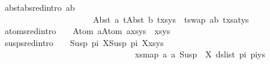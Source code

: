 \begin{isabellebody}
\ \ abst{\isacharunderscore}{\kern0pt}ab{\isacharunderscore}{\kern0pt}sred{\isacharbrackleft}{\kern0pt}intro{\isacharbang}{\kern0pt}{\isacharbrackright}{\kern0pt}{\isacharcolon}{\kern0pt}\ {\isachardoublequoteopen}a{\isasymnoteq}b\ {\isasymLongrightarrow}\ \isanewline
\ \ \ \ \ \ \ \ \ \ \ \ \ \ \ \ \ \ \ \ \ \ \ {\isacharparenleft}{\kern0pt}{\isacharparenleft}{\kern0pt}Abst\ a\ t{}{\isasymapprox}{\isacharquery}{\kern0pt}Abst\ b\ t{}{\isacharparenright}{\kern0pt}{\isacharhash}{\kern0pt}xs{\isacharcomma}{\kern0pt}ys{\isacharparenright}{\kern0pt}\ {\isasymturnstile}{\isacharbrackleft}{\kern0pt}{\isacharbrackright}{\kern0pt}{\isasymleadsto}\ {\isacharparenleft}{\kern0pt}{\isacharparenleft}{\kern0pt}t{}{\isasymapprox}{\isacharquery}{\kern0pt}swap\ {\isacharbrackleft}{\kern0pt}{\isacharparenleft}{\kern0pt}a{\isacharcomma}{\kern0pt}b{\isacharparenright}{\kern0pt}{\isacharbrackright}{\kern0pt}\ t{}{\isacharparenright}{\kern0pt}{\isacharhash}{\kern0pt}xs{\isacharcomma}{\kern0pt}{\isacharparenleft}{\kern0pt}a{\isasymsharp}{\isacharquery}{\kern0pt}t{}{\isacharparenright}{\kern0pt}{\isacharhash}{\kern0pt}ys{\isacharparenright}{\kern0pt}{\isachardoublequoteclose}\ {\isacharbar}{\kern0pt}\isanewline
\ \ atom{\isacharunderscore}{\kern0pt}sred{\isacharbrackleft}{\kern0pt}intro{\isacharbang}{\kern0pt}{\isacharbrackright}{\kern0pt}{\isacharcolon}{\kern0pt}\ \ \ \ {\isachardoublequoteopen}{\isacharparenleft}{\kern0pt}{\isacharparenleft}{\kern0pt}Atom\ a{\isasymapprox}{\isacharquery}{\kern0pt}Atom\ a{\isacharparenright}{\kern0pt}{\isacharhash}{\kern0pt}xs{\isacharcomma}{\kern0pt}ys{\isacharparenright}{\kern0pt}\ {\isasymturnstile}{\isacharbrackleft}{\kern0pt}{\isacharbrackright}{\kern0pt}{\isasymleadsto}\ {\isacharparenleft}{\kern0pt}xs{\isacharcomma}{\kern0pt}ys{\isacharparenright}{\kern0pt}{\isachardoublequoteclose}\ {\isacharbar}{\kern0pt}\isanewline
\ \ susp{\isacharunderscore}{\kern0pt}sred{\isacharbrackleft}{\kern0pt}intro{\isacharbang}{\kern0pt}{\isacharbrackright}{\kern0pt}{\isacharcolon}{\kern0pt}\ \ \ \ {\isachardoublequoteopen}{\isacharparenleft}{\kern0pt}{\isacharparenleft}{\kern0pt}Susp\ pi{}\ X{\isasymapprox}{\isacharquery}{\kern0pt}Susp\ pi{}\ X{\isacharparenright}{\kern0pt}{\isacharhash}{\kern0pt}xs{\isacharcomma}{\kern0pt}ys{\isacharparenright}{\kern0pt}\ \isanewline
\ \ \ \ \ \ \ \ \ \ \ \ \ \ \ \ \ \ \ \ \ \ \ \ \ \ \ \ \ \ \ \ {\isasymturnstile}{\isacharbrackleft}{\kern0pt}{\isacharbrackright}{\kern0pt}{\isasymleadsto}\ {\isacharparenleft}{\kern0pt}xs{\isacharcomma}{\kern0pt}{\isacharparenleft}{\kern0pt}map\ {\isacharparenleft}{\kern0pt}{\isasymlambda}a{\isachardot}{\kern0pt}\ a{\isasymsharp}{\isacharquery}{\kern0pt}\ Susp\ {\isacharbrackleft}{\kern0pt}{\isacharbrackright}{\kern0pt}\ X{\isacharparenright}{\kern0pt}\ {\isacharparenleft}{\kern0pt}ds{\isacharunderscore}{\kern0pt}list\ pi{}\ pi{}{\isacharparenright}{\kern0pt}{\isacharparenright}{\kern0pt}{\isacharat}{\kern0pt}ys{\isacharparenright}{\kern0pt}{\isachardoublequoteclose}\ {\isacharbar}{\kern0pt}\ \isanewline

\end{isabellebody}
